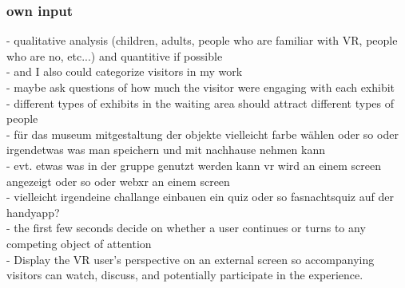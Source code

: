 \documentclass{article}
\begin{document}
\subsubsection{own input}
- qualitative analysis (children, adults, people who are familiar with VR, people who are no, etc...) and quantitive if possible
\\
- and I also could categorize visitors in my work
\\
- maybe ask questions of how much the visitor were engaging with each exhibit
\\
- different types of exhibits in the waiting area should attract different types of people
\\
- für das museum mitgestaltung der objekte vielleicht farbe wählen oder so oder irgendetwas was man speichern und mit nachhause nehmen kann
\\
- evt. etwas was in der gruppe genutzt werden kann vr wird an einem screen angezeigt oder so oder webxr an einem screen
\\
- vielleicht irgendeine challange einbauen ein quiz oder so fasnachtsquiz auf der handyapp?
\\
- the first few seconds decide on whether a user continues or turns to any competing object of attention
\\
- Display the VR user's perspective on an external screen so accompanying visitors can watch, discuss, and potentially participate in the experience.
\end{document}
